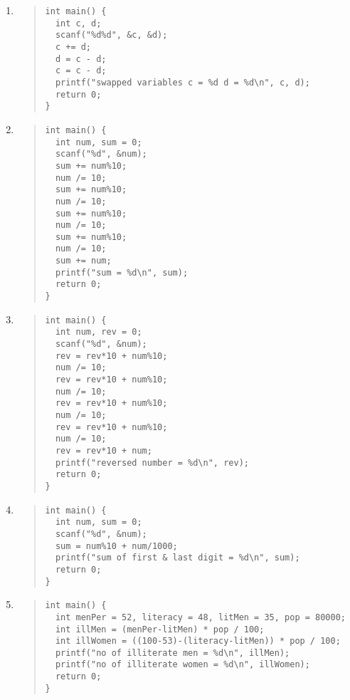 \documentclass{report}
\begin{document}
\begin{enumerate}
  \item \begin{quote} \begin{verbatim}
int main() {
  int c, d;
  scanf("%d%d", &c, &d);
  c += d;
  d = c - d;
  c = c - d;
  printf("swapped variables c = %d d = %d\n", c, d);
  return 0;
}
  \end{verbatim} \end{quote} 

  \item \begin{quote} \begin{verbatim}
int main() {
  int num, sum = 0;
  scanf("%d", &num);
  sum += num%10;
  num /= 10;
  sum += num%10;
  num /= 10;
  sum += num%10;
  num /= 10;
  sum += num%10;
  num /= 10;
  sum += num;
  printf("sum = %d\n", sum);
  return 0;
}
  \end{verbatim} \end{quote} 
  
  \item \begin{quote} \begin{verbatim}
int main() {
  int num, rev = 0;
  scanf("%d", &num);
  rev = rev*10 + num%10;
  num /= 10;
  rev = rev*10 + num%10;
  num /= 10;
  rev = rev*10 + num%10;
  num /= 10;
  rev = rev*10 + num%10;
  num /= 10;
  rev = rev*10 + num;
  printf("reversed number = %d\n", rev);
  return 0;
}
  \end{verbatim} \end{quote} 

  \item \begin{quote} \begin{verbatim}
int main() {
  int num, sum = 0;
  scanf("%d", &num);
  sum = num%10 + num/1000;
  printf("sum of first & last digit = %d\n", sum);
  return 0;
}
  \end{verbatim} \end{quote} 

  \item \begin{quote} \begin{verbatim}
int main() {
  int menPer = 52, literacy = 48, litMen = 35, pop = 80000;
  int illMen = (menPer-litMen) * pop / 100;
  int illWomen = ((100-53)-(literacy-litMen)) * pop / 100;
  printf("no of illiterate men = %d\n", illMen);
  printf("no of illiterate women = %d\n", illWomen);
  return 0;
}
  \end{verbatim} \end{quote} 


\end{enumerate}
\end{document}
